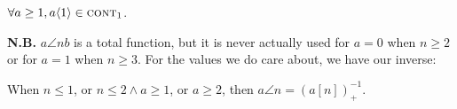 \begin{col} \label{col: inv-hyperop-1-contr1}
$\forall a \ge 1, a\langle 1\rangle \in \text{\scshape{cont}}_1$.
\end{col}
\textbf{N.B.} $a\angle{n}b$ is a total function, but it is never actually used for $a = 0$ when $n \ge 2$ or for $a=1$ when $n \ge 3$. For the values
we do care about, we have our inverse:
\begin{thm} \label{thm: inv-hyperop-correct}
When $n\le 1$, or $n \le 2 \wedge a\ge 1$, or $a\ge 2$, then
$a\angle{n} = \left(a[n]\right)^{-1}_+$.
\end{thm}
